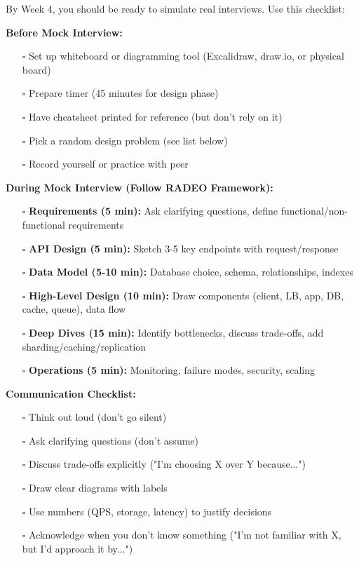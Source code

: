 \documentclass[10pt]{article}
\begin{document}
By Week 4, you should be ready to simulate real interviews. Use this checklist:

\textbf{Before Mock Interview:}
\begin{itemize}
\item[$\square$] Set up whiteboard or diagramming tool (Excalidraw, draw.io, or physical board)
\item[$\square$] Prepare timer (45 minutes for design phase)
\item[$\square$] Have cheatsheet printed for reference (but don't rely on it)
\item[$\square$] Pick a random design problem (see list below)
\item[$\square$] Record yourself or practice with peer
\end{itemize}

\textbf{During Mock Interview (Follow RADEO Framework):}
\begin{itemize}
\item[$\square$] \textbf{Requirements (5 min):} Ask clarifying questions, define functional/non-functional requirements
\item[$\square$] \textbf{API Design (5 min):} Sketch 3-5 key endpoints with request/response
\item[$\square$] \textbf{Data Model (5-10 min):} Database choice, schema, relationships, indexes
\item[$\square$] \textbf{High-Level Design (10 min):} Draw components (client, LB, app, DB, cache, queue), data flow
\item[$\square$] \textbf{Deep Dives (15 min):} Identify bottlenecks, discuss trade-offs, add sharding/caching/replication
\item[$\square$] \textbf{Operations (5 min):} Monitoring, failure modes, security, scaling
\end{itemize}

\textbf{Communication Checklist:}
\begin{itemize}
\item[$\square$] Think out loud (don't go silent)
\item[$\square$] Ask clarifying questions (don't assume)
\item[$\square$] Discuss trade-offs explicitly ("I'm choosing X over Y because...")
\item[$\square$] Draw clear diagrams with labels
\item[$\square$] Use numbers (QPS, storage, latency) to justify decisions
\item[$\square$] Acknowledge when you don't know something ("I'm not familiar with X, but I'd approach it by...")
\end{itemize}
\end{document}

